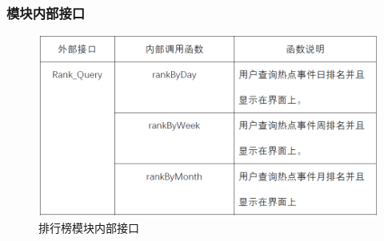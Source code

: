 \subsubsection{模块内部接口}
\begin{figure}[!htbp]
	\centering
	\includegraphics[scale=0.75]{image/b17.png} %
	\caption{排行榜模块内部接口} %
\end{figure}
